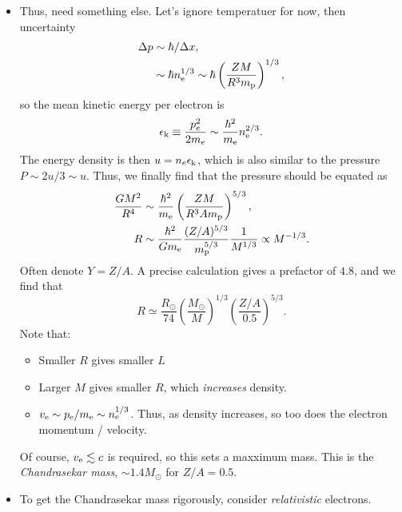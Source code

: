 \documentclass[11pt,
        usenames, %
        dvipsnames %
    ]{article}
\newcommand*{\p}[1]{\left(#1\right)}
\begin{document}
\begin{itemize}
    \item Thus, need something else. Let's ignore temperatuer for now, then
        uncertainty
        \begin{align}
            \Delta p &\sim \hbar / \Delta x,\\
                &\sim \hbar n_{\rm e}^{1/3}
                    \sim \hbar \p{\frac{ZM}{R^3m_{\rm p}}}^{1/3},
        \end{align}
        so the mean kinetic energy per electron is
        \begin{equation}
            \epsilon_{\rm k} \equiv \frac{p_e^2}{2m_e}
                \sim \frac{\hbar^2}{m_{\rm e}} n_{\rm e}^{2/3}.
        \end{equation}
        The energy density is then $u = n_e \epsilon_{\rm k}$, which is also
        similar to the pressure $P \sim 2u/3 \sim u$. Thus, we finally find that
        the pressure should be equated as
        \begin{align}
            \frac{GM^2}{R^4} &\sim \frac{\hbar^2}{m_{\rm e}}
                \p{\frac{ZM}{R^3 Am_{\rm p}}}^{5/3},\\
            R &\sim \frac{\hbar^2}{Gm_{\rm e}}
                \frac{(Z/A)^{5/3}}{m_{\rm p}^{5/3}}
                \frac{1}{M^{1/3}} \propto M^{-1/3}.
        \end{align}
        Often denote $Y = Z / A$. A precise calculation gives a prefactor of
        $4.8$, and we find that
        \begin{equation}
            R \simeq \frac{R_{\odot}}{74}
                \p{\frac{M_{\odot}}{M}}^{1/3}
                \p{\frac{Z/A}{0.5}}^{5/3}.
        \end{equation}
        Note that:
        \begin{itemize}
            \item Smaller $R$ gives smaller $L$
            \item Larger $M$ gives smaller $R$, which \emph{increases} density.
            \item $v_{\rm e} \sim p_{\rm e} / m_{\rm e} \sim n_{\rm e}^{1/3}$.
                Thus, as density increases, so too does the electron momentum /
                velocity.
        \end{itemize}
        Of course, $v_{\rm e} \lesssim c$ is required, so this sets a maxximum
        mass. This is the \emph{Chandrasekar mass}, $\sim 1.4M_{\odot}$ for $Z /
        A = 0.5$.

    \item To get the Chandrasekar mass rigorously, consider \emph{relativistic}
        electrons.
\end{itemize}
\end{document}
